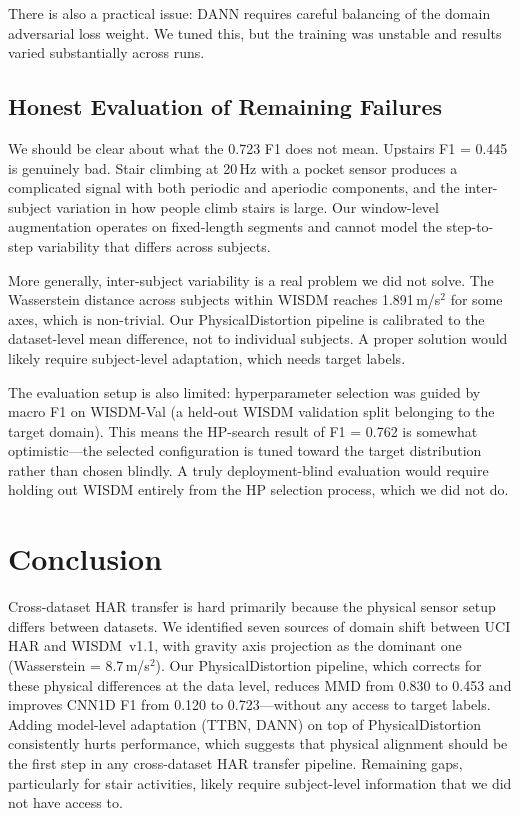 \documentclass[12pt]{article}
\begin{document}
There is also a practical issue: DANN requires careful balancing of the domain adversarial loss weight. We tuned this, but the training was unstable and results varied substantially across runs.

\subsection{Honest Evaluation of Remaining Failures}

We should be clear about what the 0.723 F1 does not mean. Upstairs F1 = 0.445 is genuinely bad. Stair climbing at 20\,Hz with a pocket sensor produces a complicated signal with both periodic and aperiodic components, and the inter-subject variation in how people climb stairs is large. Our window-level augmentation operates on fixed-length segments and cannot model the step-to-step variability that differs across subjects.

More generally, inter-subject variability is a real problem we did not solve. The Wasserstein distance across subjects within WISDM reaches 1.891\,m/s$^2$ for some axes, which is non-trivial. Our PhysicalDistortion pipeline is calibrated to the dataset-level mean difference, not to individual subjects. A proper solution would likely require subject-level adaptation, which needs target labels.

The evaluation setup is also limited: hyperparameter selection was guided by macro F1 on WISDM-Val (a held-out WISDM validation split belonging to the target domain). This means the HP-search result of F1 = 0.762 is somewhat optimistic—the selected configuration is tuned toward the target distribution rather than chosen blindly. A truly deployment-blind evaluation would require holding out WISDM entirely from the HP selection process, which we did not do.

\section{Conclusion}

Cross-dataset HAR transfer is hard primarily because the physical sensor setup differs between datasets. We identified seven sources of domain shift between UCI HAR and WISDM~v1.1, with gravity axis projection as the dominant one (Wasserstein = 8.7\,m/s$^2$). Our PhysicalDistortion pipeline, which corrects for these physical differences at the data level, reduces MMD from 0.830 to 0.453 and improves CNN1D F1 from 0.120 to 0.723—without any access to target labels. Adding model-level adaptation (TTBN, DANN) on top of PhysicalDistortion consistently hurts performance, which suggests that physical alignment should be the first step in any cross-dataset HAR transfer pipeline. Remaining gaps, particularly for stair activities, likely require subject-level information that we did not have access to.
\end{document}

